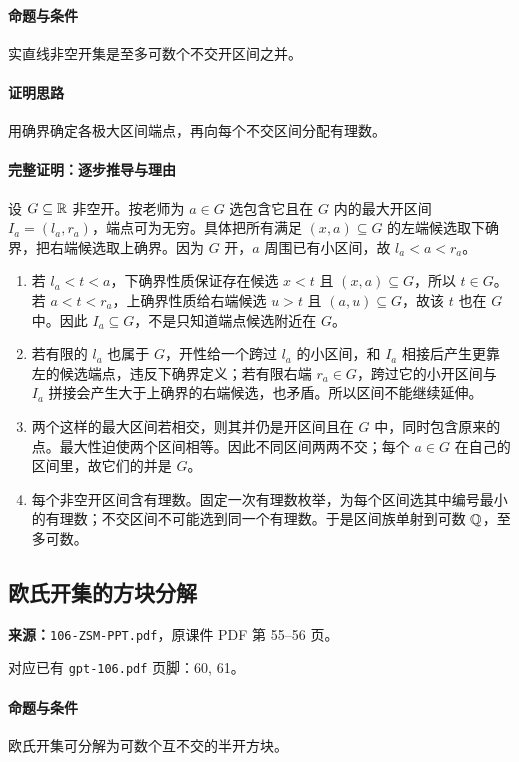 \paragraph{命题与条件}实直线非空开集是至多可数个不交开区间之并。
\paragraph{证明思路}用确界确定各极大区间端点，再向每个不交区间分配有理数。
\paragraph{完整证明：逐步推导与理由}

设 $G\subseteq\mathbb{R}$ 非空开。按老师为 $a\in G$ 选包含它且在 $G$ 内的最大开区间 $I_a=(l_a,r_a)$，端点可为无穷。具体把所有满足 $(x,a)\subseteq G$ 的左端候选取下确界，把右端候选取上确界。因为 $G$ 开，$a$ 周围已有小区间，故 $l_a<a<r_a$。
\begin{enumerate}
\item 若 $l_a<t<a$，下确界性质保证存在候选 $x<t$ 且 $(x,a)\subseteq G$，所以 $t\in G$。若 $a<t<r_a$，上确界性质给右端候选 $u>t$ 且 $(a,u)\subseteq G$，故该 $t$ 也在 $G$ 中。因此 $I_a\subseteq G$，不是只知道端点候选附近在 $G$。
\item 若有限的 $l_a$ 也属于 $G$，开性给一个跨过 $l_a$ 的小区间，和 $I_a$ 相接后产生更靠左的候选端点，违反下确界定义；若有限右端 $r_a\in G$，跨过它的小开区间与 $I_a$ 拼接会产生大于上确界的右端候选，也矛盾。所以区间不能继续延伸。
\item 两个这样的最大区间若相交，则其并仍是开区间且在 $G$ 中，同时包含原来的点。最大性迫使两个区间相等。因此不同区间两两不交；每个 $a\in G$ 在自己的区间里，故它们的并是 $G$。
\item 每个非空开区间含有理数。固定一次有理数枚举，为每个区间选其中编号最小的有理数；不交区间不可能选到同一个有理数。于是区间族单射到可数 $\mathbb{Q}$，至多可数。
\end{enumerate}

\clearpage\subsection{欧氏开集的方块分解}
\textbf{来源：}\texttt{106-ZSM-PPT.pdf}，原课件 PDF 第 55--56 页。\par
对应已有 \texttt{gpt-106.pdf} 页脚：60, 61。\par
\paragraph{命题与条件}欧氏开集可分解为可数个互不交的半开方块。
